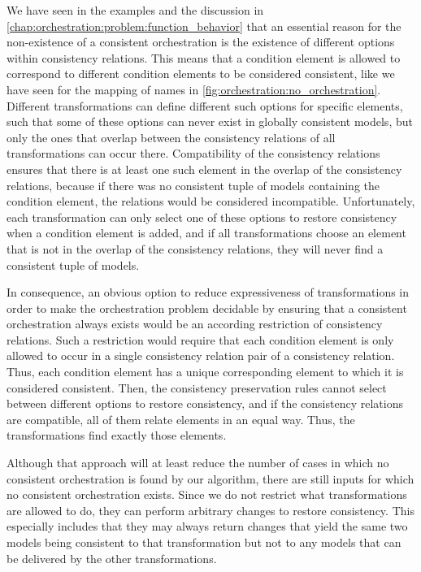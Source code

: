 We have seen in the examples and the discussion in \autoref{chap:orchestration:problem:function_behavior} that an essential reason for the non-existence of a consistent orchestration is the existence of different options within consistency relations.
This means that a condition element is allowed to correspond to different condition elements to be considered consistent, like we have seen for the mapping of names in \autoref{fig:orchestration:no_orchestration}.
Different transformations can define different such options for specific elements, such that some of these options can never exist in globally consistent models, but only the ones that overlap between the consistency relations of all transformations can occur there.
Compatibility of the consistency relations ensures that there is at least one such element in the overlap of the consistency relations, because if there was no consistent tuple of models containing the condition element, the relations would be considered incompatible.
Unfortunately, each transformation can only select one of these options to restore consistency when a condition element is added, and if all transformations choose an element that is not in the overlap of the consistency relations, they will never find a consistent tuple of models.

In consequence, an obvious option to reduce expressiveness of transformations in order to make the orchestration problem decidable by ensuring that a consistent orchestration always exists would be an according restriction of consistency relations.
Such a restriction would require that each condition element is only allowed to occur in a single consistency relation pair of a consistency relation.
Thus, each condition element has a unique corresponding element to which it is considered consistent.
Then, the consistency preservation rules cannot select between different options to restore consistency, and if the consistency relations are compatible, all of them relate elements in an equal way.
Thus, the transformations find exactly those elements.

Although that approach will at least reduce the number of cases in which no consistent orchestration is found by our algorithm, there are still inputs for which no consistent orchestration exists.
Since we do not restrict what transformations are allowed to do, they can perform arbitrary changes to restore consistency.
This especially includes that they may always return changes that yield the same two models being consistent to that transformation but not to any models that can be delivered by the other transformations.

